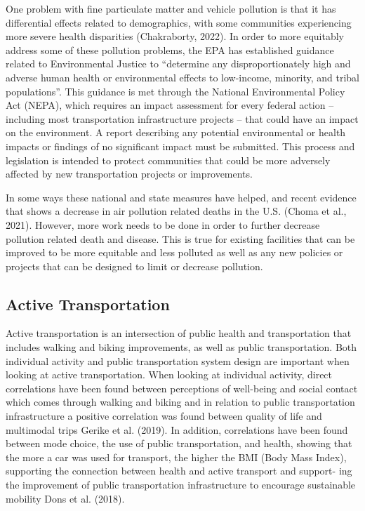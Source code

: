 \documentclass[
  letterpaper,
  DIV=11,
  numbers=noendperiod]{scrreport}
\begin{document}
One problem with fine particulate matter and vehicle pollution is that
it has differential effects related to demographics, with some
communities experiencing more severe health disparities (Chakraborty,
2022). In order to more equitably address some of these pollution
problems, the EPA has established guidance related to Environmental
Justice to ``determine any disproportionately high and adverse human
health or environmental effects to low-income, minority, and tribal
populations''. This guidance is met through the National Environmental
Policy Act (NEPA), which requires an impact assessment for every federal
action -- including most transportation infrastructure projects -- that
could have an impact on the environment. A report describing any
potential environmental or health impacts or findings of no significant
impact must be submitted. This process and legislation is intended to
protect communities that could be more adversely affected by new
transportation projects or improvements.

In some ways these national and state measures have helped, and recent
evidence that shows a decrease in air pollution related deaths in the
U.S. (Choma et al., 2021). However, more work needs to be done in order
to further decrease pollution related death and disease. This is true
for existing facilities that can be improved to be more equitable and
less polluted as well as any new policies or projects that can be
designed to limit or decrease pollution.

\hypertarget{active-transportation}{%
\subsection{Active Transportation}\label{active-transportation}}

Active transportation is an intersection of public health and
transportation that includes walking and biking improvements, as well as
public transportation. Both individual activity and public
transportation system design are important when looking at active
transportation. When looking at individual activity, direct correlations
have been found between perceptions of well-being and social contact
which comes through walking and biking and in relation to public
transportation infrastructure a positive correlation was found between
quality of life and multimodal trips Gerike et al. (2019). In addition,
correlations have been found between mode choice, the use of public
transportation, and health, showing that the more a car was used for
transport, the higher the BMI (Body Mass Index), supporting the
connection between health and active transport and support- ing the
improvement of public transportation infrastructure to encourage
sustainable mobility Dons et al. (2018).
\end{document}

